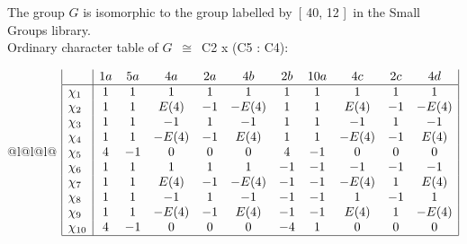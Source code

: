 \documentclass[varwidth=\maxdimen,border=10]{standalone}
\begin{document}
The group $G$ is isomorphic to the group labelled by\ [ 40, 12 ]\ in the Small Groups library.\\
Ordinary character table of $G$\ $\cong$\ C2 x (C5 : C4):\\
\begin{center}
\begin{tabular}{@{}l@{}l@{}l@{}}
\hline
\(\begin{array}{|l|cccccccccc|}
  & 1a & 5a & 4a & 2a & 4b & 2b & 10a & 4c & 2c & 4d\\ \hline
\chi_{1} & 1 & 1 & 1 & 1 & 1 & 1 & 1 & 1 & 1 & 1\\
\chi_{2} & 1 & 1 & E(4) & -1 & -E(4) & 1 & 1 & E(4) & -1 & -E(4)\\
\chi_{3} & 1 & 1 & -1 & 1 & -1 & 1 & 1 & -1 & 1 & -1\\
\chi_{4} & 1 & 1 & -E(4) & -1 & E(4) & 1 & 1 & -E(4) & -1 & E(4)\\
\chi_{5} & 4 & -1 & 0 & 0 & 0 & 4 & -1 & 0 & 0 & 0\\
\chi_{6} & 1 & 1 & 1 & 1 & 1 & -1 & -1 & -1 & -1 & -1\\
\chi_{7} & 1 & 1 & E(4) & -1 & -E(4) & -1 & -1 & -E(4) & 1 & E(4)\\
\chi_{8} & 1 & 1 & -1 & 1 & -1 & -1 & -1 & 1 & -1 & 1\\
\chi_{9} & 1 & 1 & -E(4) & -1 & E(4) & -1 & -1 & E(4) & 1 & -E(4)\\
\chi_{10} & 4 & -1 & 0 & 0 & 0 & -4 & 1 & 0 & 0 & 0\\
\hline
\end{array}\)\\
\end{tabular}
\end{center}
\end{document}
